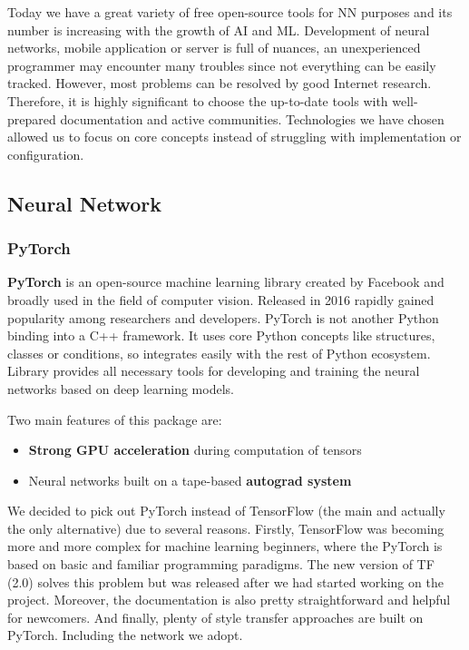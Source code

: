 \documentclass[../Main.tex]{subfiles}
\begin{document}
Today we have a great variety of free open-source tools for NN purposes and its
number is increasing with the growth of AI and ML. Development of neural networks,
mobile application or server is full of nuances, an unexperienced programmer may 
encounter many troubles since not everything can be easily tracked. However, most
problems can be resolved by good Internet research. Therefore, it is highly significant
to choose the up-to-date tools with well-prepared documentation and active communities. 
Technologies we have chosen allowed us to focus on core concepts instead of 
struggling with implementation or configuration.

\subsection{Neural Network}

    \subsubsection{PyTorch}
        \textbf{PyTorch} is an open-source machine learning library created by Facebook and broadly used in the field of computer vision. Released in 2016 rapidly gained popularity among researchers and developers. PyTorch is not another Python binding into a C++ framework. It uses core Python concepts like structures, classes or conditions, so integrates easily with the rest of Python ecosystem. Library provides all necessary tools for developing and training the neural networks based on deep learning models.
        
        Two main features of this package are:
        \begin{itemize}
            \item \textbf{Strong GPU acceleration} during computation of tensors
            \item Neural networks built on a tape-based \textbf{autograd system}
        \end{itemize}
        
        We decided to pick out PyTorch instead of TensorFlow (the main and actually the only alternative) due to several reasons. Firstly, TensorFlow was becoming more and more complex for machine learning beginners, where the PyTorch is based on basic and familiar programming paradigms. The new version of TF (2.0) solves this problem but was released after we had started working on the project. Moreover, the documentation is also pretty straightforward and helpful for newcomers. And finally, plenty of style transfer approaches are built on PyTorch. Including the network we adopt. 
\end{document}

